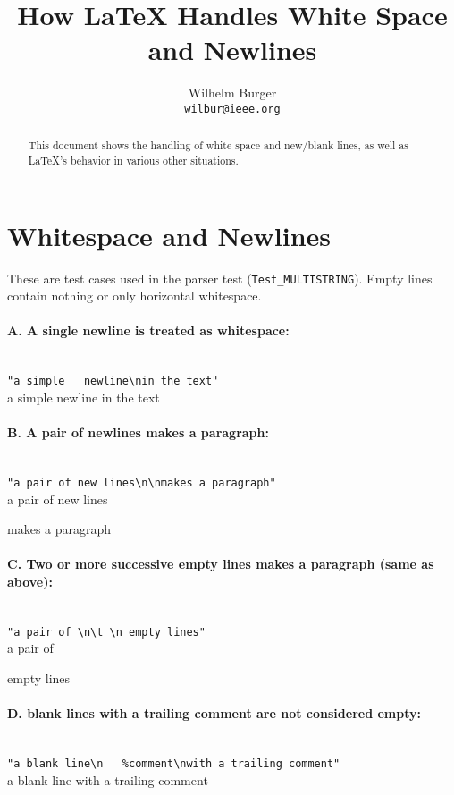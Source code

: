 \documentclass[a4paper]{article}
\author{Wilhelm Burger\\ 
\texttt{wilbur@ieee.org}}
\title{How LaTeX Handles White Space and Newlines}
\date{}
\begin{document}
\maketitle
\clearpage
\tableofcontents
\clearpage

\begin{abstract}\noindent
This document shows the handling of white space and new/blank lines, as
well as LaTeX's behavior in various other situations.
\end{abstract}

\section{Whitespace and Newlines}

These are test cases used in the parser test (\verb!Test_MULTISTRING!).
Empty lines contain nothing or only horizontal whitespace.

\paragraph{A. A single newline is treated as whitespace:} ~\\
\verb!"a simple   newline\nin the text"!\\
a simple   newline
in the text

\paragraph{B. A pair of newlines makes a paragraph:} ~\\
\verb!"a pair of new lines\n\nmakes a paragraph"!\\
a pair of new lines

makes a paragraph


\paragraph{C. Two or more successive empty lines makes a paragraph (same as above):} ~\\
\verb!"a pair of \n\t \n empty lines"!\\
a pair of 
	
 empty lines
	
\paragraph{D. blank lines with a trailing comment are not considered empty:} ~\\
\verb!"a blank line\n   %comment\nwith a trailing comment"!\\
a blank line
with a trailing comment
\end{document}
